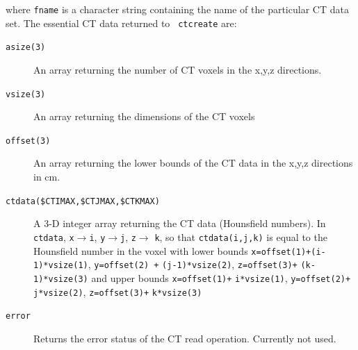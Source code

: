 \documentclass[12pt,twoside]{article}      %
\begin{document}
\noindent where {\tt fname} is a character string containing the name of the
particular CT data set.  The essential CT data returned to {\tt
ctcreate} are:
\begin {description}
\item [{\tt asize(3)}]  An array returning the number of CT voxels in the
                     x,y,z directions.
\item [{\tt vsize(3)}]  An array returning the dimensions of the CT voxels

\item [{\tt offset(3)}] An array returning the lower bounds of the CT data
                      in the x,y,z directions in cm.
\item [{\tt ctdata(\$CTIMAX,\$CTJMAX,\$CTKMAX)}] A 3-D integer array
           returning the CT data (Hounsfield numbers).  In {\tt ctdata},
    {\tt x}$\rightarrow${\tt i},
    {\tt y}$\rightarrow${\tt j},
    {\tt z}$\rightarrow$ {\tt k}, so that {\tt ctdata(i,j,k)} is
    equal to the Hounsfield number in the voxel with lower bounds
    {\tt x=offset(1)+(i-1)*vsize(1)}, {\tt y=offset(2) +} {\tt (j-1)*vsize(2)},
    {\tt z=offset(3)+} {\tt (k-1)*vsize(3)} and
    upper bounds {\tt x=offset(1)+} {\tt i*vsize(1)},
    {\tt y=offset(2)+} {\tt j*vsize(2)}, {\tt z=offset(3)+} {\tt k*vsize(3)}
\item [{\tt error}] Returns the error status of the CT read operation.
                    Currently not used.
\end {description}
\end{document}
